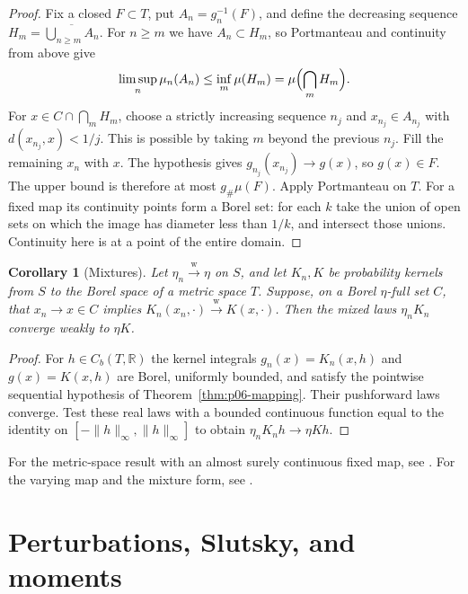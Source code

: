 \documentclass[11pt,oneside,openany]{book}
\newcommand{\R}{\mathbb{R}}
\newcommand{\weakto}{\xrightarrow{\mathrm{w}}}
\theoremstyle{plain}
\newtheorem{corollary}[theorem]{Corollary}
\theoremstyle{definition}
\theoremstyle{remark}
\begin{document}
\begin{proof}
Fix a closed \(F\subset T\), put \(A_n=g_n^{-1}(F)\), and define the
decreasing sequence \(H_m=\overline{\bigcup_{n\geq m}A_n}\).
For \(n\geq m\) we have \(A_n\subset H_m\), so Portmanteau and
continuity from above give
\[
 \limsup_n\mu_n(A_n)\leq\inf_m\mu(H_m)
    =\mu\Bigl(\bigcap_m H_m\Bigr).
\]
For \(x\in C\cap\bigcap_m H_m\), choose a strictly increasing sequence
\(n_j\) and \(x_{n_j}\in A_{n_j}\) with \(d(x_{n_j},x)<1/j\).
This is possible by taking \(m\) beyond the previous \(n_j\).
Fill the remaining \(x_n\) with \(x\). The hypothesis gives
\(g_{n_j}(x_{n_j})\to g(x)\), so \(g(x)\in F\).
The upper bound is therefore at most \(g_\#\mu(F)\). Apply
Portmanteau on \(T\). For a fixed map its continuity points form a
Borel set: for each \(k\) take the union of open sets on which the
image has diameter less than \(1/k\), and intersect those unions.
Continuity here is at a point of the entire domain.
\end{proof}

\begin{corollary}[Mixtures]
\label{cor:p06-mixtures}
Let \(\eta_n\weakto\eta\) on \(S\), and let \(K_n,K\) be probability
kernels from \(S\) to the Borel space of a metric space \(T\).
Suppose, on a Borel \(\eta\)-full set \(C\), that \(x_n\to x\in C\)
implies \(K_n(x_n,\cdot)\weakto K(x,\cdot)\). Then the mixed laws
\(\eta_n K_n\) converge weakly to \(\eta K\).
\end{corollary}

\begin{proof}
For \(h\in C_b(T,\R)\) the kernel integrals \(g_n(x)=K_n(x,h)\)
and \(g(x)=K(x,h)\) are Borel, uniformly bounded, and satisfy the
pointwise sequential hypothesis of Theorem~\ref{thm:p06-mapping}.
Their pushforward laws converge. Test these real laws with a
bounded continuous function equal to the identity on
\([-\lVert h\rVert_\infty,\lVert h\rVert_\infty]\) to obtain
\(\eta_n K_n h\to\eta K h\).
\end{proof}

For the metric-space result with an almost surely continuous fixed map,
see \cite[Theorem 2.7, p.~21]{Billingsley}. For the varying map and the
mixture form, see
\cite[Theorem 5.27 and Corollary 5.28, pp.~117--118]{Kallenberg}.

\section{Perturbations, Slutsky, and moments}
\label{p06-04}
\end{document}
